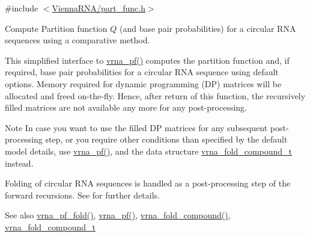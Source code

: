 {\ttfamily \#include $<$\hyperlink{part__func_8h}{Vienna\+R\+N\+A/part\+\_\+func.\+h}$>$}



Compute Partition function $Q$ (and base pair probabilities) for a circular R\+N\+A sequences using a comparative method. 

This simplified interface to \hyperlink{group__pf__fold_ga29e256d688ad221b78d37f427e0e99bc}{vrna\+\_\+pf()} computes the partition function and, if required, base pair probabilities for a circular R\+N\+A sequence using default options. Memory required for dynamic programming (D\+P) matrices will be allocated and free\textquotesingle{}d on-\/the-\/fly. Hence, after return of this function, the recursively filled matrices are not available any more for any post-\/processing.

\begin{DoxyNote}{Note}
In case you want to use the filled D\+P matrices for any subsequent post-\/processing step, or you require other conditions than specified by the default model details, use \hyperlink{group__pf__fold_ga29e256d688ad221b78d37f427e0e99bc}{vrna\+\_\+pf()}, and the data structure \hyperlink{group__fold__compound_ga1b0cef17fd40466cef5968eaeeff6166}{vrna\+\_\+fold\+\_\+compound\+\_\+t} instead.
\end{DoxyNote}
Folding of circular R\+N\+A sequences is handled as a post-\/processing step of the forward recursions. See \cite{hofacker:2006} for further details.

\begin{DoxySeeAlso}{See also}
\hyperlink{group__pf__fold_ga59935ba485ac90f0efb5a38e2962d879}{vrna\+\_\+pf\+\_\+fold()}, \hyperlink{group__pf__fold_ga29e256d688ad221b78d37f427e0e99bc}{vrna\+\_\+pf()}, \hyperlink{group__fold__compound_ga6601d994ba32b11511b36f68b08403be}{vrna\+\_\+fold\+\_\+compound()}, \hyperlink{group__fold__compound_ga1b0cef17fd40466cef5968eaeeff6166}{vrna\+\_\+fold\+\_\+compound\+\_\+t}
\end{DoxySeeAlso}

